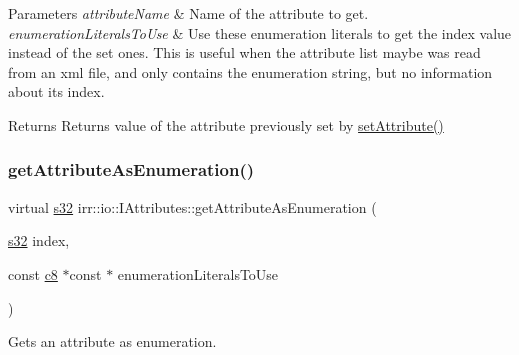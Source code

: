 \begin{DoxyParams}{Parameters}
{\em attribute\+Name} & Name of the attribute to get. \\
\hline
{\em enumeration\+Literals\+To\+Use} & Use these enumeration literals to get the index value instead of the set ones. This is useful when the attribute list maybe was read from an xml file, and only contains the enumeration string, but no information about its index. \\
\hline
\end{DoxyParams}
\begin{DoxyReturn}{Returns}
Returns value of the attribute previously set by \hyperlink{classirr_1_1io_1_1IAttributes_a03fa31acb481ae23678676cc183f09a6}{set\+Attribute()} 
\end{DoxyReturn}
\mbox{\label{classirr_1_1io_1_1IAttributes_a906b34ac742d3418d16afcf1d1e2aaa4}} 
\subsubsection{\texorpdfstring{get\+Attribute\+As\+Enumeration()}{getAttributeAsEnumeration()}\hspace{0.1cm}{\footnotesize\ttfamily [5/8]}}
{\footnotesize\ttfamily virtual \hyperlink{namespaceirr_ac66849b7a6ed16e30ebede579f9b47c6}{s32} irr\+::io\+::\+I\+Attributes\+::get\+Attribute\+As\+Enumeration (\begin{DoxyParamCaption}\item[{\hyperlink{namespaceirr_ac66849b7a6ed16e30ebede579f9b47c6}{s32}}]{index,  }\item[{const \hyperlink{namespaceirr_a9395eaea339bcb546b319e9c96bf7410}{c8} $\ast$const $\ast$}]{enumeration\+Literals\+To\+Use }\end{DoxyParamCaption})\hspace{0.3cm}{\ttfamily [pure virtual]}}



Gets an attribute as enumeration. 



